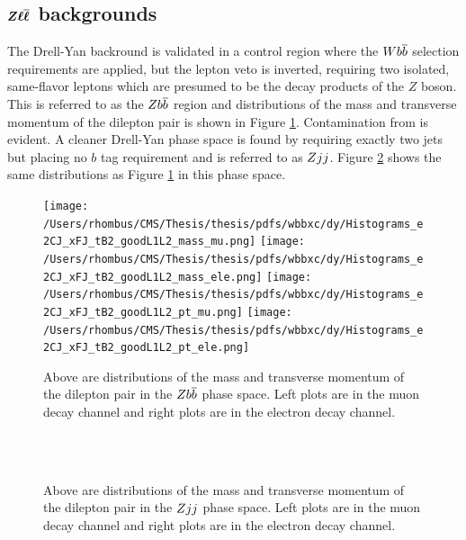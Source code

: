 \subsection[\zll backgrounds]{$\boldsymbol{Z\ell\overline{\ell}}$ backgrounds}

The Drell-Yan backround is validated in a control region where the $W b\overline{b}$
 selection requirements are applied, but the lepton veto 
 is inverted, requiring two isolated, same-flavor leptons
 which are presumed to be the decay products of the $Z$ boson.
This is referred to as the $Z b\overline{b}$ region and distributions
 of the mass and transverse momentum of the dilepton pair is
 shown in Figure \ref{fig:prefit_dybb}.
Contamination from \ttbar is evident. 
A cleaner Drell-Yan phase space is found by requiring exactly two jets
 but placing no $b$ tag requirement and is referred to as $Z jj$.
Figure \ref{fig:prefit_dyjj} shows the same distributions as
 Figure \ref{fig:prefit_dybb} in this phase space.

\begin{figure}
      \caption[\zbb control region for the \wbb analysis]{ Above are distributions of the mass and
        transverse momentum of the dilepton pair in the
        $Z b\overline{b}$ phase space.
       Left plots are in the muon decay channel and right
        plots are in the electron decay channel.
      }
      \center
\texttt{[image: /Users/rhombus/CMS/Thesis/thesis/pdfs/wbbxc/dy/Histograms\_e2CJ\_xFJ\_tB2\_goodL1L2\_mass\_mu.png]}
\texttt{[image: /Users/rhombus/CMS/Thesis/thesis/pdfs/wbbxc/dy/Histograms\_e2CJ\_xFJ\_tB2\_goodL1L2\_mass\_ele.png]}
\texttt{[image: /Users/rhombus/CMS/Thesis/thesis/pdfs/wbbxc/dy/Histograms\_e2CJ\_xFJ\_tB2\_goodL1L2\_pt\_mu.png]}
\texttt{[image: /Users/rhombus/CMS/Thesis/thesis/pdfs/wbbxc/dy/Histograms\_e2CJ\_xFJ\_tB2\_goodL1L2\_pt\_ele.png]}
      \label{fig:prefit_dybb}
\end{figure}

\begin{figure}
      \caption[\zjj control region for the \wbb measurement]{ Above are distributions of the mass and
        transverse momentum of the dilepton pair in the
        $Z jj$ phase space.
       Left plots are in the muon decay channel and right
        plots are in the electron decay channel.
      }
      \center
  \\
  \\
      \label{fig:prefit_dyjj}
\end{figure}


